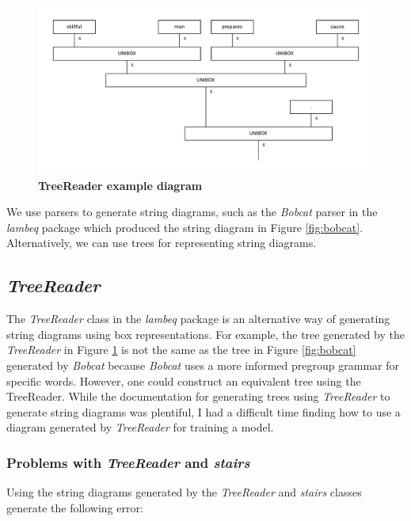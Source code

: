 \documentclass[12pt ]{article}
\begin{document}
\begin{figure}[t!]
  \centering
\includegraphics[width=\textwidth]{../test/output/treereader.pdf}
  \caption{ {\bf TreeReader example diagram}}
  \label{fig:treereader}
\end{figure} 
We use parsers to generate string diagrams, such as the {\it Bobcat} parser in the {\it lambeq} package which produced the string diagram in Figure \ref{fig:bobcat}. Alternatively, we can use trees for representing string diagrams.

\subsection{{\it TreeReader}}
The {\it TreeReader} class in the {\it lambeq} package is an alternative way of generating string diagrams using box representations. For example, the tree generated by the {\it TreeReader} in Figure \ref{fig:treereader} is not the same as the tree in Figure \ref{fig:bobcat} generated by {\it Bobcat} because {\it Bobcat} uses a more informed pregroup grammar for specific words. However, one could construct an equivalent tree using the TreeReader. While the documentation for generating trees using {\it TreeReader } to generate string diagrams was plentiful, I had a difficult time finding how to use a diagram generated by {\it TreeReader } for training a model.

\subsubsection{Problems with {\it TreeReader} and {\it stairs}}
Using the string diagrams generated by the {\it TreeReader} and {\it stairs} classes generate the following error:
\end{document}
